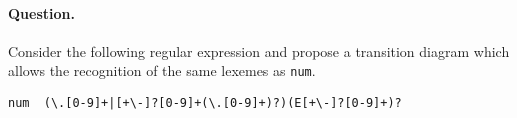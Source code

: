 \paragraph{Question.} Consider the following \Lex regular expression
and propose a transition diagram which allows the recognition of the
same lexemes as \verb|num|.
{\small
  \begin{verbatim}
num  (\.[0-9]+|[+\-]?[0-9]+(\.[0-9]+)?)(E[+\-]?[0-9]+)?
  \end{verbatim}
}
